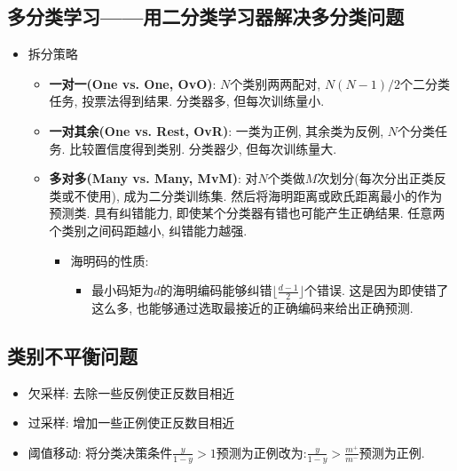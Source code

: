\documentclass[UTF8]{article}
\newcommand{\floor}[1]{\lfloor#1\rfloor}
\begin{document}
\subsection{多分类学习——用二分类学习器解决多分类问题}
\begin{itemize}
\item 拆分策略
	\begin{itemize}
	\item \textbf{一对一(One vs. One, OvO)}: $N$个类别两两配对, $N(N-1)/2$个二分类任务, 投票法得到结果. 分类器多, 但每次训练量小.
	\item \textbf{一对其余(One vs. Rest, OvR)}: 一类为正例, 其余类为反例, $N$个分类任务. 比较置信度得到类别. 分类器少, 但每次训练量大.
	\item \textbf{多对多(Many vs. Many, MvM)}: 对$N$个类做$M$次划分(每次分出正类反类或不使用), 成为二分类训练集. 然后将海明距离或欧氏距离最小的作为预测类. 具有纠错能力, 即使某个分类器有错也可能产生正确结果. 任意两个类别之间码距越小, 纠错能力越强.
		\begin{itemize}
		\item 海明码的性质:
			\begin{itemize}
			\item 最小码矩为$d$的海明编码能够纠错$\floor{\frac{d-1}{2}}$个错误. 这是因为即使错了这么多, 也能够通过选取最接近的正确编码来给出正确预测.
			\end{itemize}
		\end{itemize}
	\end{itemize}
\end{itemize}
\subsection{类别不平衡问题}
\begin{itemize}
\item 欠采样: 去除一些反例使正反数目相近
\item 过采样: 增加一些正例使正反数目相近
\item 阈值移动: 将分类决策条件$\frac{y}{1-y}>1$预测为正例改为:$\frac{y}{1-y}>\frac{m^+}{m^-}$预测为正例.
\end{itemize}
\end{document}
